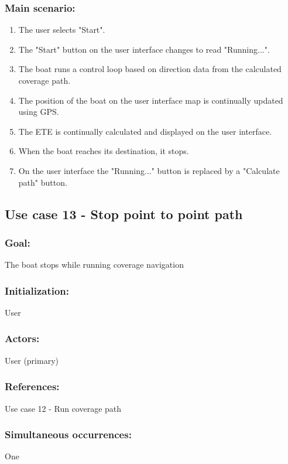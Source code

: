 \subsubsection*{Main scenario:}
\begin{enumerate}
	\item The user selects "Start".
	\item The "Start" button on the user interface changes to read "Running...".
	\item The boat runs a control loop based on direction data from the calculated coverage path.
	\item The position of the boat on the user interface map is continually updated using GPS.
	\item The ETE is continually calculated and displayed on the user interface.
	\item When the boat reaches its destination, it stops.
	\item On the user interface the "Running..." button is replaced by a "Calculate path" button.
\end{enumerate}	


\subsection{Use case 13 - Stop point to point path}
\subsubsection*{Goal:}
The boat stops while running coverage navigation

\subsubsection*{Initialization:}
User

\subsubsection*{Actors:}
User (primary)

\subsubsection*{References:}
Use case 12 - Run coverage path

\subsubsection*{Simultaneous occurrences:}
One 

